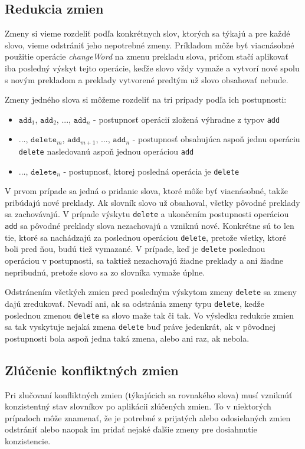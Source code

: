 \documentclass[
  digital, %
  table,   %
  lof,     %
  lot,     %
]{fithesis3}
\begin{document}
\subsection{Redukcia zmien}
Zmeny si vieme rozdeliť podľa konkrétnych slov, ktorých sa týkajú a pre každé slovo, vieme odstrániť jeho nepotrebné zmeny. Príkladom môže byť viacnásobné použitie operácie \textit{changeWord} na zmenu prekladu slova, pričom stačí aplikovať iba posledný výskyt tejto operácie, keďže slovo vždy vymaže a vytvorí nové spolu s novým prekladom a preklady vytvorené predtým už slovo obsahovať nebude.

Zmeny jedného slova si môžeme rozdeliť na tri prípady podľa ich postupnosti:
\begin{itemize}
\item $\texttt{add}_1$, $\texttt{add}_2$, ..., $\texttt{add}_n$ - postupnosť operácií zložená výhradne z typov \texttt{add}
\item ..., $\texttt{delete}_{m}$, $\texttt{add}_{m+1}$, ..., $\texttt{add}_n$ - postupnosť obsahujúca aspoň jednu operáciu \texttt{delete} nasledovanú aspoň jednou operáciou \texttt{add}
\item ..., $\texttt{delete}_{n}$ - postupnosť, ktorej posledná operácia je \texttt{delete}
\end{itemize}

V prvom prípade sa jedná o pridanie slova, ktoré môže byť viacnásobné, takže pribúdajú nové preklady. Ak slovník slovo už obsahoval, všetky pôvodné preklady sa zachovávajú. V prípade výskytu \texttt{delete} a ukončením postupnosti operáciou \texttt{add} sa pôvodné preklady slova nezachovajú a vzniknú nové. Konkrétne sú to len tie, ktoré sa nachádzajú za poslednou operáciou \texttt{delete}, pretože všetky, ktoré boli pred ňou, budú tiež vymazané. V prípade, keď je \texttt{delete} poslednou operáciou v postupnosti, sa taktiež nezachovajú žiadne preklady a ani žiadne nepribudnú, pretože slovo sa zo slovníka vymaže úplne.

Odstránením všetkých zmien pred posledným výskytom zmeny \texttt{delete} sa zmeny dajú zredukovať. Nevadí ani, ak sa odstránia zmeny typu \texttt{delete}, kedže poslednou zmenou \texttt{delete} sa slovo maže tak či tak. Vo výsledku redukcie zmien sa tak vyskytuje nejaká zmena \texttt{delete} buď práve jedenkrát, ak v pôvodnej postupnosti bola aspoň jedna taká zmena, alebo ani raz, ak nebola.

\subsection{Zlúčenie konfliktných zmien}
Pri zlučovaní konfliktných zmien (týkajúcich sa rovnakého slova) musí vzniknúť konzistentný stav slovníkov po aplikácii zlúčených zmien. To v niektorých prípadoch môže znamenať, že je potrebné z prijatých alebo odosielaných zmien odstrániť alebo naopak im pridať nejaké ďalšie zmeny pre dosiahnutie konzistencie.
\end{document}
